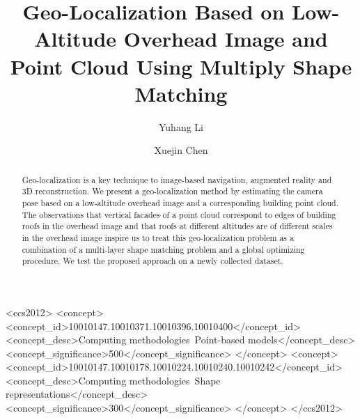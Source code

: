 \documentclass[sigconf,authorversion]{acmart}
\begin{document}
\title{Geo-Localization Based on Low-Altitude Overhead Image and Point Cloud Using Multiply Shape Matching}

\author{Yuhang Li}

\author{Xuejin Chen}


\begin{abstract}

Geo-localization is a key technique to image-based navigation, augmented reality and 3D reconstruction. We present a geo-localization method by estimating the camera pose based on a low-altitude overhead image and a corresponding building point cloud. The observations that vertical facades of a point cloud correspond to edges of building roofs in the overhead image and that roofs at different altitudes are of different scales in the overhead image inspire us to treat this geo-localization problem as a combination of a multi-layer shape matching problem and a global optimizing procedure. We test the proposed approach on a newly collected dataset. 

\end{abstract}

%
%
\begin{CCSXML}
	<ccs2012>
	<concept>
	<concept_id>10010147.10010371.10010396.10010400</concept_id>
	<concept_desc>Computing methodologies~Point-based models</concept_desc>
	<concept_significance>500</concept_significance>
	</concept>
	<concept>
	<concept_id>10010147.10010178.10010224.10010240.10010242</concept_id>
	<concept_desc>Computing methodologies~Shape representations</concept_desc>
	<concept_significance>300</concept_significance>
	</concept>
	</ccs2012>
\end{CCSXML}






 
\end{document}
